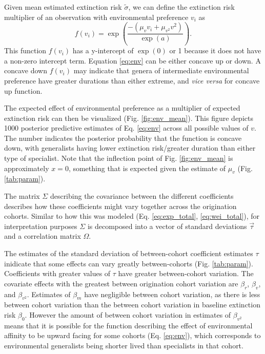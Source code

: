 \documentclass{article}
\begin{document}
Given mean estimated extinction risk \(\tilde{\sigma}\), we can define the extinction risk multiplier of an observation with environmental preference \(v_{i}\) as 
\begin{equation}
  f(v_{i}) = \exp\left(\frac{-(\mu_{v} v_{i} + \mu_{v^{2}} v^{2})}{\exp(a)}\right).
  \label{eq:env}
\end{equation}
This function \(f(v_{i})\) has a y-intercept of \(\exp(0)\) or 1 because it does not have a non-zero intercept term. Equation \ref{eq:env} can be either concave up or down. A concave down \(f(v_{i})\) may indicate that genera of intermediate environmental preference have greater durations than either extreme, and \textit{vice versa} for concave up function.

The expected effect of environmental preference as a multiplier of expected extinction risk can then be visualized (Fig. \ref{fig:env_mean}). This figure depicts 1000 posterior predictive estimates of Eq. \ref{eq:env} across all possible values of \(v\). The number indicates the posterior probability that the function is concave down, with generalists having lower extinction risk/greater duration than either type of specialist. Note that the inflection point of Fig. \ref{fig:env_mean} is approximately \(x = 0\), something that is expected given the estimate of \(\mu_{v}\) (Fig. \ref{tab:param}).

The matrix \(\Sigma\) describing the covariance between the different coefficients describes how these coefficients might vary together across the origination cohorts. Similar to how this was modeled (Eq. \ref{eq:exp_total}, \ref{eq:wei_total}), for interpretation purposes \(\Sigma\) is decomposed into a vector of standard deviations \(\vec{\tau}\) and a correlation matrix \(\Omega\).

The estimates of the standard deviation of between-cohort coefficient estimates \(\tau\) inidicate that some effects can vary greatly between-cohorts (Fig. \ref{tab:param}). Coefficients with greater values of \(\tau\) have greater between-cohort variation. The covariate effects with the greatest between origination cohort variation are \(\beta_{r}\), \(\beta_{v}\), and \(\beta_{v^{2}}\). Estimates of \(\beta_{m}\) have negligible between cohort variation, as there is less between cohort variation than the between cohort variation in baseline extinction risk \(\beta_{0}\). However the amount of between cohort variation in estimates of \(\beta_{v^{2}}\) means that it is possible for the function describing the effect of environmental affinity to be upward facing for some cohorts (Eq. \ref{eq:env}), which corresponds to environmental generalists being shorter lived than specialists in that cohort.
\end{document}
